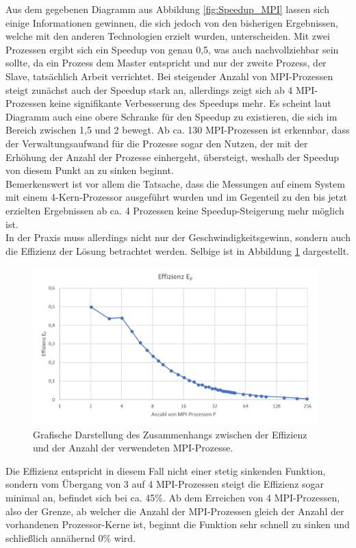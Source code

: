 \begin{description}
						Aus dem gegebenen Diagramm aus Abbildung \ref{fig:Speedup_MPI} lassen sich einige Informationen gewinnen, die sich jedoch von den bisherigen Ergebnissen, welche mit den anderen Technologien erzielt wurden, unterscheiden. Mit zwei Prozessen ergibt sich ein Speedup von genau 0,5, was auch nachvollziehbar sein sollte, da ein Prozess dem Master entspricht und nur der zweite Prozess, der Slave, tatsächlich Arbeit verrichtet. Bei steigender Anzahl von MPI-Prozessen steigt zunächst auch der Speedup stark an, allerdings zeigt sich ab 4 MPI-Prozessen keine signifikante Verbesserung des Speedups mehr. Es scheint laut Diagramm auch eine obere Schranke für den Speedup zu existieren, die sich im Bereich zwischen 1,5 und 2 bewegt. Ab ca. 130 MPI-Prozessen ist erkennbar, dass der Verwaltungsaufwand für die Prozesse sogar den Nutzen, der mit der Erhöhung der Anzahl der Prozesse einhergeht, übersteigt, weshalb der Speedup von diesem Punkt an zu sinken beginnt.\\
						Bemerkenswert ist vor allem die Tatsache, dass die Messungen auf einem System mit einem 4-Kern-Prozessor ausgeführt wurden und im Gegenteil zu den bis jetzt erzielten Ergebnissen ab ca. 4 Prozessen keine Speedup-Steigerung mehr möglich ist.\\
						In der Praxis muss allerdings nicht nur der Geschwindigkeitsgewinn, sondern auch die Effizienz der Lösung betrachtet werden. Selbige ist in Abbildung \ref{fig:Effizienz_MPI} dargestellt.
						
						\begin{figure}
							\centering	
							\includegraphics[width=11cm]{Abbildungen/Effizienz_MPI.png}
							\caption{Grafische Darstellung des Zusammenhangs zwischen der Effizienz und der Anzahl der verwendeten MPI-Prozesse.}
							\label{fig:Effizienz_MPI}
						\end{figure}
						
						Die Effizienz entspricht in diesem Fall nicht einer stetig sinkenden Funktion, sondern vom Übergang von 3 auf 4 MPI-Prozessen steigt die Effizienz sogar minimal an, befindet sich bei ca. 45\%. Ab dem Erreichen von 4 MPI-Prozessen, also der Grenze, ab welcher die Anzahl der MPI-Prozessen gleich der Anzahl der vorhandenen Prozessor-Kerne ist, beginnt die Funktion sehr schnell zu sinken und schließlich annähernd 0\% wird.
						

\end{description}
